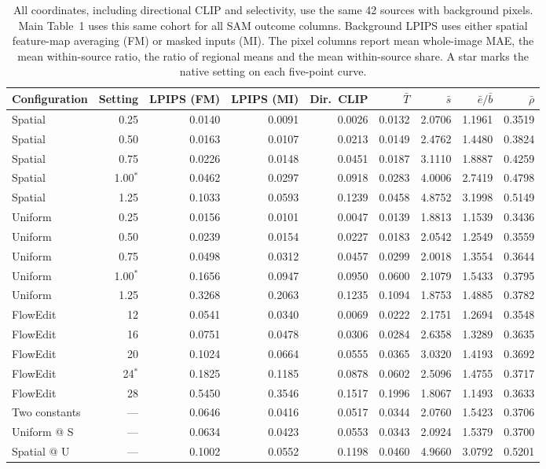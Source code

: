 \begin{table}[t]
\centering\small
\caption{All coordinates, including directional CLIP and selectivity, use the same 42 sources with background pixels. Main Table~1 uses this same cohort for all SAM outcome columns. Background LPIPS uses either spatial feature-map averaging (FM) or masked inputs (MI). The pixel columns report mean whole-image MAE, the mean within-source ratio, the ratio of regional means and the mean within-source share. A star marks the native setting on each five-point curve.}
\label{tab:v19-selectivity-points}
\begin{tabular}{@{}lrrrrrrrr@{}}
\toprule
Configuration & Setting & LPIPS (FM) & LPIPS (MI) & Dir.\ CLIP & $\bar T$ & $\bar s$ & $\bar e/\bar b$ & $\bar\rho$\\
\midrule
Spatial & 0.25 & 0.0140 & 0.0091 & 0.0026 & 0.0132 & 2.0706 & 1.1961 & 0.3519 \\
Spatial & 0.50 & 0.0163 & 0.0107 & 0.0213 & 0.0149 & 2.4762 & 1.4480 & 0.3824 \\
Spatial & 0.75 & 0.0226 & 0.0148 & 0.0451 & 0.0187 & 3.1110 & 1.8887 & 0.4259 \\
Spatial & 1.00$^{*}$ & 0.0462 & 0.0297 & 0.0918 & 0.0283 & 4.0006 & 2.7419 & 0.4798 \\
Spatial & 1.25 & 0.1033 & 0.0593 & 0.1239 & 0.0458 & 4.8752 & 3.1998 & 0.5149 \\
\midrule
Uniform & 0.25 & 0.0156 & 0.0101 & 0.0047 & 0.0139 & 1.8813 & 1.1539 & 0.3436 \\
Uniform & 0.50 & 0.0239 & 0.0154 & 0.0227 & 0.0183 & 2.0542 & 1.2549 & 0.3559 \\
Uniform & 0.75 & 0.0498 & 0.0312 & 0.0457 & 0.0299 & 2.0018 & 1.3554 & 0.3644 \\
Uniform & 1.00$^{*}$ & 0.1656 & 0.0947 & 0.0950 & 0.0600 & 2.1079 & 1.5433 & 0.3795 \\
Uniform & 1.25 & 0.3268 & 0.2063 & 0.1235 & 0.1094 & 1.8753 & 1.4885 & 0.3782 \\
\midrule
FlowEdit & 12 & 0.0541 & 0.0340 & 0.0069 & 0.0222 & 2.1751 & 1.2694 & 0.3548 \\
FlowEdit & 16 & 0.0751 & 0.0478 & 0.0306 & 0.0284 & 2.6358 & 1.3289 & 0.3635 \\
FlowEdit & 20 & 0.1024 & 0.0664 & 0.0555 & 0.0365 & 3.0320 & 1.4193 & 0.3692 \\
FlowEdit & 24$^{*}$ & 0.1825 & 0.1185 & 0.0878 & 0.0602 & 2.5096 & 1.4755 & 0.3717 \\
FlowEdit & 28 & 0.5450 & 0.3546 & 0.1517 & 0.1996 & 1.8067 & 1.1493 & 0.3633 \\
\midrule
Two constants & --- & 0.0646 & 0.0416 & 0.0517 & 0.0344 & 2.0760 & 1.5423 & 0.3706 \\
Uniform @ S & --- & 0.0634 & 0.0423 & 0.0553 & 0.0343 & 2.0924 & 1.5379 & 0.3700 \\
Spatial @ U & --- & 0.1002 & 0.0552 & 0.1198 & 0.0460 & 4.9660 & 3.0792 & 0.5201 \\
\bottomrule
\end{tabular}
\end{table}

